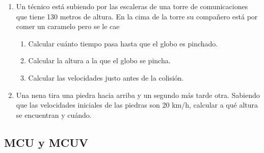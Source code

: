 \begin{enumerate}
\item Un técnico está subiendo por las escaleras de una torre de comunicaciones que tiene 130 metros de altura. En la cima de la torre su compañero está por comer un caramelo pero se le cae
\begin{enumerate}
    \item Calcular cuánto tiempo pasa hasta que el
    globo es pinchado.
    \item Calcular la altura a la que el globo se pincha.
    \item Calcular las velocidades justo antes de la colisión.
\end{enumerate}

\item Una nena tira una piedra hacia arriba y un segundo más tarde otra. Sabiendo que las velocidades iniciales de las piedras son 20 km/h, calcular a qué altura se encuentran y cuándo.
\end{enumerate}


\newpage
\subsection{MCU y MCUV}

